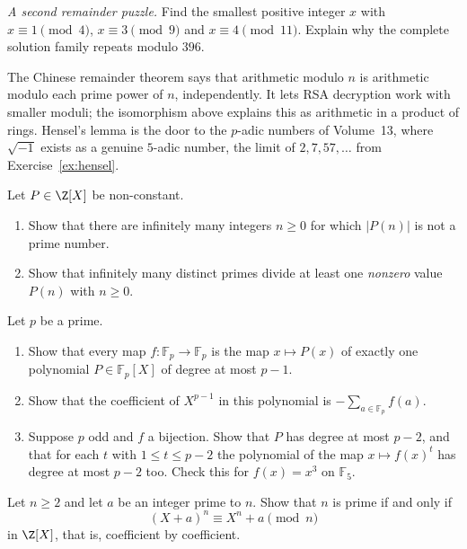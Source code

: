 \begin{exercise}[$\star$]\label{ex:t1-sunzi23}
\emph{A second remainder puzzle.} Find the smallest positive integer $x$ with $x\equiv1\pmod4$, $x\equiv3\pmod9$ and $x\equiv4\pmod{11}$. Explain why the complete solution family repeats modulo $396$.
\end{exercise}

\begin{beauty}
The Chinese remainder theorem says that arithmetic modulo $n$ is arithmetic modulo each prime power of $n$, independently. It lets RSA decryption work with smaller moduli; the isomorphism above explains this as arithmetic in a product of rings. Hensel's lemma is the door to the $p$-adic numbers of Volume~13, where $\sqrt{-1}$ exists as a genuine $5$-adic number, the limit of $2,7,57,\dots$ from Exercise~\ref{ex:hensel}.
\end{beauty}

\begin{exercise}[$\star\star$]\label{pb:primepoly}
Let $P\in\Z[X]$ be non-constant.
\begin{enumerate}[label=(\alph*)]
\item Show that there are infinitely many integers $n\ge0$ for which $|P(n)|$ is not a prime number.
\item Show that infinitely many distinct primes divide at least one \emph{nonzero} value $P(n)$ with $n\ge0$.
\end{enumerate}
\end{exercise}

\begin{exercise}[$\star\star$]\label{pb:fpfunctions}
Let $p$ be a prime.
\begin{enumerate}[label=(\alph*)]
\item Show that every map $f:\mathbb F_p\to\mathbb F_p$ is the map $x\mapsto P(x)$ of exactly one polynomial $P\in\mathbb F_p[X]$
of degree at most $p-1$.
\item Show that the coefficient of $X^{p-1}$ in this polynomial is $-\sum_{a\in\mathbb F_p}f(a)$.
\item Suppose $p$ odd and $f$ a bijection. Show that $P$ has degree at most $p-2$, and that for each $t$ with $1\le t\le p-2$
the polynomial of the map $x\mapsto f(x)^t$ has degree at most $p-2$ too. Check this for $f(x)=x^3$ on $\mathbb F_5$.
\end{enumerate}
\end{exercise}

\begin{exercise}[$\star\star$]\label{pb:aks}
Let $n\ge2$ and let $a$ be an integer prime to $n$. Show that $n$ is prime if and only if
\[
(X+a)^n\equiv X^n+a\pmod n
\]
in $\Z[X]$, that is, coefficient by coefficient.
\end{exercise}

